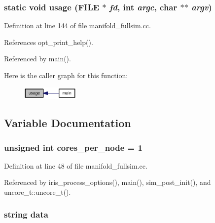\subsubsection[{usage}]{\setlength{\rightskip}{0pt plus 5cm}static void usage (FILE $\ast$ {\em fd}, \/  int {\em argc}, \/  char $\ast$$\ast$ {\em argv})\hspace{0.3cm}{\tt  [static]}}\label{manifold__fullsim_8cc_4b40663cf65d8f5b9ef33ac7cdad3ea2}




Definition at line 144 of file manifold\_\-fullsim.cc.

References opt\_\-print\_\-help().

Referenced by main().

Here is the caller graph for this function:\nopagebreak
\begin{figure}[H]
\begin{center}
\leavevmode
\includegraphics[width=80pt]{manifold__fullsim_8cc_4b40663cf65d8f5b9ef33ac7cdad3ea2_icgraph}
\end{center}
\end{figure}


\subsection{Variable Documentation}
\subsubsection[{cores\_\-per\_\-node}]{\setlength{\rightskip}{0pt plus 5cm}unsigned int {\bf cores\_\-per\_\-node} = 1}\label{manifold__fullsim_8cc_d1fe1c89980f30a3204e89fe23449677}




Definition at line 48 of file manifold\_\-fullsim.cc.

Referenced by iris\_\-process\_\-options(), main(), sim\_\-post\_\-init(), and uncore\_\-t::uncore\_\-t().
\subsubsection[{data}]{\setlength{\rightskip}{0pt plus 5cm}string {\bf data}}\label{manifold__fullsim_8cc_bbd74d905a52bdcb0b21f0b8b4fcc1ba}




